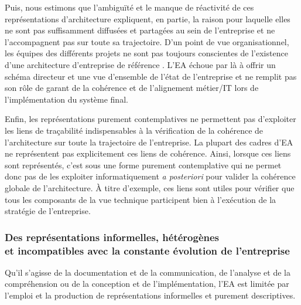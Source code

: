 Puis, nous estimons que l'ambiguïté et le manque de réactivité de ces
représentations d'architecture expliquent, en partie, la raison pour laquelle
elles ne sont pas suffisamment diffusées et partagées au sein de l'entreprise
et ne l'accompagnent pas sur toute sa trajectoire. D'un point de vue
organisationnel, les équipes des différents projets ne sont pas toujours
conscientes de l'existence d'une architecture d'entreprise de référence
\cite{shah2007frameworks}. L'EA échoue par là à offrir un schéma directeur et
une vue d'ensemble de l'état de l'entreprise et ne remplit pas son rôle de
garant de la cohérence et de l'alignement métier/IT lors de l'implémentation du
système final.

Enfin, les représentations purement contemplatives ne permettent pas
d'exploiter les liens de traçabilité indispensables à la vérification de la
cohérence de l'architecture sur toute la trajectoire de l'entreprise. La
plupart des cadres d'EA ne représentent pas explicitement ces liens de
cohérence. Ainsi, lorsque ces liens sont représentés, c'est sous une forme
purement contemplative qui ne permet donc pas de les exploiter informatiquement
\textit{a posteriori} pour valider la cohérence globale de l'architecture. À
titre d'exemple, ces liens sont utiles pour vérifier que tous les composants de
la vue technique participent bien à l'exécution de la stratégie de
l'entreprise.

\subsubsection{Des représentations informelles, hétérogènes \\
               et incompatibles avec la constante évolution de l'entreprise}
\label{sec:roles}

Qu'il s'agisse de la documentation et de la communication, de l'analyse et de
la compréhension ou de la conception et de l'implémentation, l'EA est limitée
par l'emploi et la production de représentations informelles et purement
descriptives.

